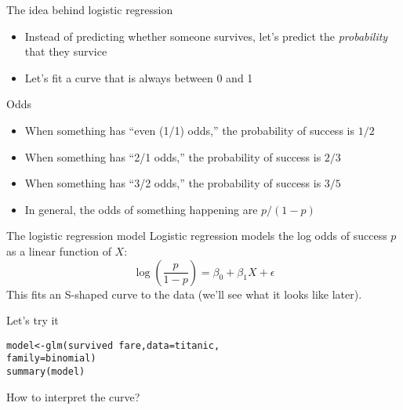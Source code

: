 \documentclass{beamer}\usepackage[]{graphicx}\usepackage[]{color}
\makeatletter
\newcommand{\hlopt}[1]{\textcolor[rgb]{1,0.894,0.769}{#1}}%
\newcommand{\hlstd}[1]{\textcolor[rgb]{1,0.894,0.769}{#1}}%
\newcommand{\hlkwb}[1]{\textcolor[rgb]{0.804,0.776,0.451}{#1}}%
\newcommand{\hlkwc}[1]{\textcolor[rgb]{0.78,0.941,0.545}{#1}}%
\newcommand{\hlkwd}[1]{\textcolor[rgb]{1,0.78,0.769}{#1}}%
\newenvironment{kframe}{%
 \def\at@end@of@kframe{}%
 \ifinner\ifhmode%
  \def\at@end@of@kframe{\end{minipage}}%
  \begin{minipage}{\columnwidth}%
 \fi\fi%
 \def\FrameCommand##1{\hskip\@totalleftmargin \hskip-\fboxsep
 \colorbox{shadecolor}{##1}\hskip-\fboxsep
     \hskip-\linewidth \hskip-\@totalleftmargin \hskip\columnwidth}%
 \MakeFramed {\advance\hsize-\width
   \@totalleftmargin\z@ \linewidth\hsize
   \@setminipage}}%
 {\par\unskip\endMakeFramed%
 \at@end@of@kframe}
\newenvironment{knitrout}{}{} %
\makeatother
\begin{document}
\begin{darkframes}
    \begin{frame}{The idea behind logistic regression}
      \begin{itemize}
        \item Instead of predicting whether someone survives, let's predict the \emph{probability} that they survice
        \item Let's fit a curve that is always between 0 and 1
      \end{itemize}
    \end{frame}

    \begin{frame}{Odds}
      \begin{itemize}
        \item When something has ``even (1/1) odds,'' the probability of success is $1/2$
        \item When something has ``2/1 odds,'' the probability of success is $2/3$
        \item When something has ``3/2 odds,'' the probability of success is $3/5$
        \item In general, the odds of something happening are $p/(1-p)$
      \end{itemize}
      \lc
    \end{frame}

    \begin{frame}{The logistic regression model}
      Logistic regression models the \alert{log odds} of success $p$ as a linear function of $X$:
      \[
        \log\left(\frac{p}{1-p}\right) = \beta_0 + \beta_1 X + \epsilon
      \]
      This fits an S-shaped curve to the data (we'll see what it looks like later).
    \end{frame}

    \begin{frame}[fragile]{Let's try it}
\begin{knitrout}
\begin{kframe}
\begin{alltt}
\hlstd{model} \hlkwb{<-} \hlkwd{glm}\hlstd{(survived} \hlopt{~} \hlstd{fare,} \hlkwc{data}\hlstd{=titanic,}
             \hlkwc{family}\hlstd{=binomial)}
\hlkwd{summary}\hlstd{(model)}
\end{alltt}
\end{kframe}
\end{knitrout}
    \end{frame}

    \begin{frame}{How to interpret the curve?}
      

\end{frame}
\end{darkframes}
\end{document}
